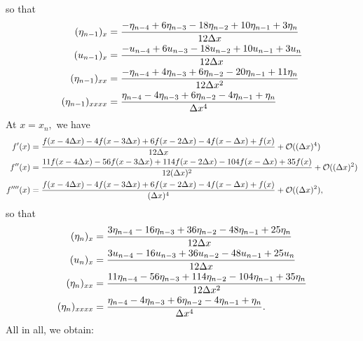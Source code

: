 \documentclass[10pt,reqno,oneside,a4paper]{article}
\begin{document}
so that
\begin{align*}
(\eta_{n-1})_x &= \frac{-\eta_{n-4} + 6 \eta_{n-3} - 18 \eta_{n-2} +10 \eta_{n-1} + 3\eta_n}{12\Delta x} \\
(u_{n-1})_x &= \frac{-u_{n-4} + 6 u_{n-3} - 18 u_{n-2} +10 u_{n-1} + 3u_n}{12\Delta x} \\
(\eta_{n-1})_{xx} &= \frac{-\eta_{n-4} + 4 \eta_{n-3} + 6 \eta_{n-2} -20 \eta_{n-1} + 11\eta_n}{12\Delta x^2} \\
(\eta_{n-1})_{xxxx} &= \frac{\eta_{n-4} -4 \eta_{n-3} +6 \eta_{n-2} -4 \eta_{n-1} + \eta_n}{\Delta x^4}
\end{align*}
At $x= x_{n},$ we have
\begin{align*}
f'(x)&= \frac{f(x-4\Delta x)-4f(x-3\Delta x) +6 f(x- 2\Delta x) -4f(x- \Delta x) +f(x)}{12\Delta x} + \mathcal{O}((\Delta x)^4) \\
f''(x)&= \frac{11f(x-4\Delta x)-56f(x-3\Delta x) +114 f(x- 2\Delta x) -104f(x- \Delta x) +35f(x)}{12(\Delta x)^2} + \mathcal{O}((\Delta x)^2) \\
f''''(x)&= \frac{f(x-4\Delta x)-4f(x-3\Delta x) +6 f(x- 2\Delta x) -4f(x- \Delta x) +f(x)}{(\Delta x)^4} + \mathcal{O}((\Delta x)^2),
\end{align*}
so that 
\begin{align*} 
(\eta_{n})_x &= \frac{3\eta_{n-4} - 16 \eta_{n-3} + 36 \eta_{n-2} - 48  \eta_{n-1} + 25\eta_n}{12\Delta x} \\
(u_{n})_x &= \frac{3u_{n-4} - 16 u_{n-3} +3 6 u_{n-2} -48 u_{n-1} + 25 u_n}{12\Delta x} \\
(\eta_{n})_{xx} &= \frac{11\eta_{n-4} -56 \eta_{n-3} + 114 \eta_{n-2} -104 \eta_{n-1} + 35\eta_n}{12\Delta x^2} \\
(\eta_{n})_{xxxx} &= \frac{\eta_{n-4} -4 \eta_{n-3} +6 \eta_{n-2} -4 \eta_{n-1} + \eta_n}{\Delta x^4}.
\end{align*}
All in all, we obtain:
\end{document}
